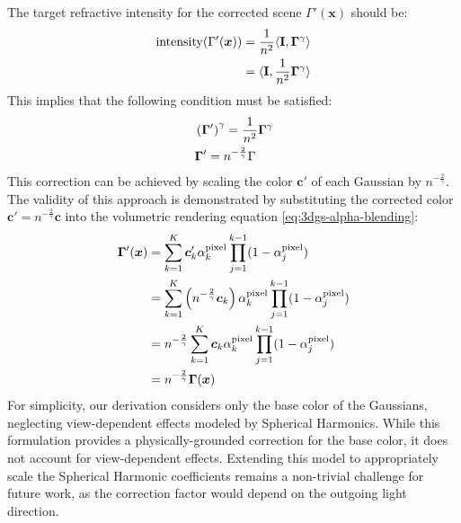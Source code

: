 The target refractive intensity for the corrected scene $\Gamma'(\bm{x})$ should be:
\begin{align}
  \mathrm{intensity}(\Gamma'(\bm{x})) &= \frac{1}{n^2}\langle\mathbf{I},\bm{\Gamma}^\gamma\rangle \notag \\
                                      &= \langle\mathbf{I}, \frac{1}{n^2} \bm{\Gamma}^\gamma\rangle  \notag \\
\end{align}
This implies that the following condition must be satisfied:
\begin{align}
  & \left(\bm{\Gamma}'\right)^\gamma = \frac{1}{n^2} \bm{\Gamma}^\gamma \notag \\
  & \bm{\Gamma}' = n^{-\frac{2}{\gamma}} \Gamma
\end{align}
This correction can be achieved by scaling the color $\bm{c}'$ of each Gaussian by $n^{-\frac{2}{\gamma}}$.
The validity of this approach is demonstrated by substituting the corrected color $\bm{c}' = n^{-\frac{2}{\gamma}} \bm{c}$  into the volumetric rendering equation \cref{eq:3dgs-alpha-blending}:
\begin{align}\label{eq:correc-color-intensity}
  \bm{\Gamma}'(\bm{x}) &= \sum_{k=1}^{K} \bm{c}'_k \alpha^{\text{pixel}}_k \prod_{j=1}^{k-1} (1-\alpha^{\text{pixel}}_j) \notag \\
                      &= \sum_{k=1}^{K} \left(n^{-\frac{2}{\gamma}}\bm{c}_k\right) \alpha^{\text{pixel}}_k \prod_{j=1}^{k-1} (1-\alpha^{\text{pixel}}_j) \notag \\
                      &= n^{-\frac{2}{\gamma}} \sum_{k=1}^{K} \bm{c}_k \alpha^{\text{pixel}}_k \prod_{j=1}^{k-1} (1-\alpha^{\text{pixel}}_j) \notag \\
                      &= n^{-\frac{2}{\gamma}} \bm{\Gamma}(\bm{x})
\end{align}
For simplicity, our derivation considers only the base color of the Gaussians, neglecting view-dependent effects modeled by Spherical Harmonics.
While this formulation provides a physically-grounded correction for the base color, it does not account for view-dependent effects. 
Extending this model to appropriately scale the Spherical Harmonic coefficients remains a non-trivial challenge for future work, as the correction factor would depend on the outgoing light direction.

